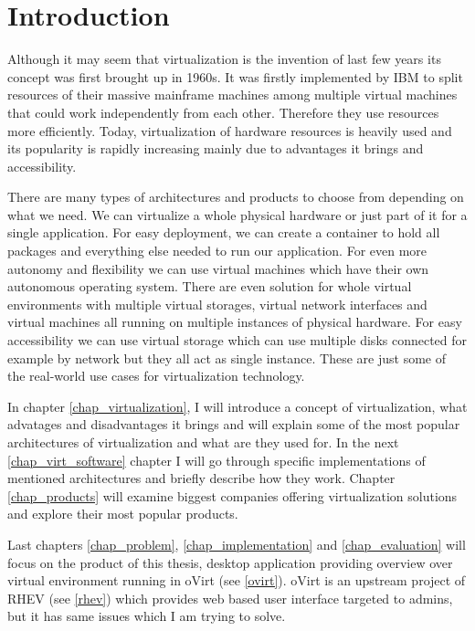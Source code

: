 
\chapter{Introduction}
Although it may seem that virtualization is the invention of last few years its concept was first brought up in 1960s. It was firstly implemented by IBM to split resources of their massive mainframe machines among multiple virtual machines that could work independently from each other. Therefore they use resources more efficiently. Today, virtualization of hardware resources is heavily used and its popularity is rapidly increasing mainly due to advantages it brings and accessibility.

There are many types of architectures and products to choose from depending on what we need. We can virtualize a whole physical hardware or just part of it for a single application. For easy deployment, we can create a container to hold all packages and everything else needed to run our application. For even more autonomy and flexibility we can use virtual machines which have their own autonomous operating system. There are even solution for whole virtual environments with multiple virtual storages, virtual network interfaces and virtual machines all running on multiple instances of physical hardware. For easy accessibility we can use virtual storage which can use multiple disks connected for example by network but they all act as single instance. These are just some of the real-world use cases for virtualization technology.

In chapter \ref{chap_virtualization}, I will introduce a concept of virtualization, what advatages and disadvantages it brings and will explain some of the most popular architectures of virtualization and what are they used for. In the next \ref{chap_virt_software} chapter I will go through specific implementations of mentioned architectures and briefly describe how they work. Chapter \ref{chap_products} will examine biggest companies offering virtualization solutions and explore their most popular products.

Last chapters \ref{chap_problem}, \ref{chap_implementation} and \ref{chap_evaluation} will focus on the product of this thesis, desktop application providing overview over virtual environment running in oVirt (see \ref{ovirt}). oVirt is an upstream project of RHEV (see \ref{rhev}) which provides web based user interface targeted to admins, but it has same issues which I am trying to solve.

